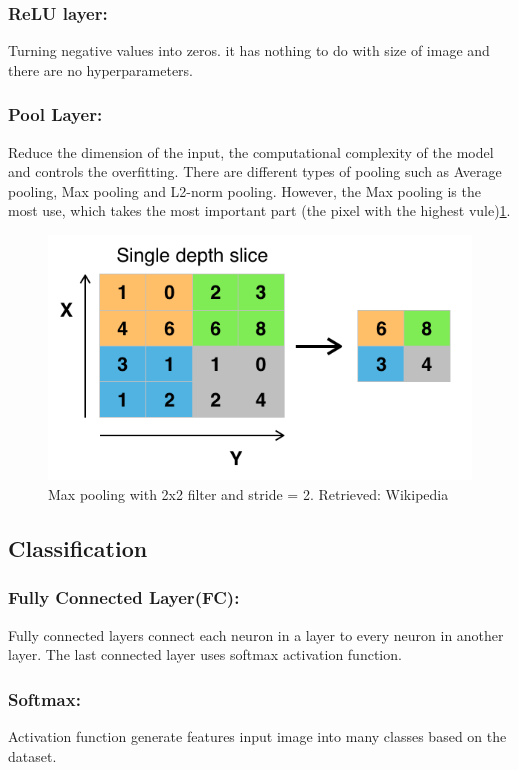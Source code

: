 \documentclass[12pt]{report}
\begin{document}
\subsubsection{ReLU layer:}
Turning negative values into zeros. it has nothing to do with size of image and there are no hyperparameters.
\subsubsection{Pool Layer:}
Reduce the dimension of the input, the computational complexity of the model and 
controls the overfitting. There are different types of pooling such as Average pooling, Max pooling and L2-norm pooling.
However, the Max pooling is the most use, which takes the most important part (the pixel with the highest vule)\ref{fig:pool}. 

\begin{figure}[h]
    \centering
    \includegraphics[width=.8\textwidth]{./images/pool.png}
    \caption{Max pooling with 2x2 filter and stride = 2. Retrieved: Wikipedia}
    \label{fig:pool}
\end{figure}

\subsection{Classification}
\subsubsection{Fully Connected Layer(FC):}
Fully connected layers connect each neuron in a layer to every neuron in another layer.
The last connected layer uses softmax activation function.
\subsubsection{Softmax:}
Activation function generate features input image into many classes based on the dataset.  
\end{document}
